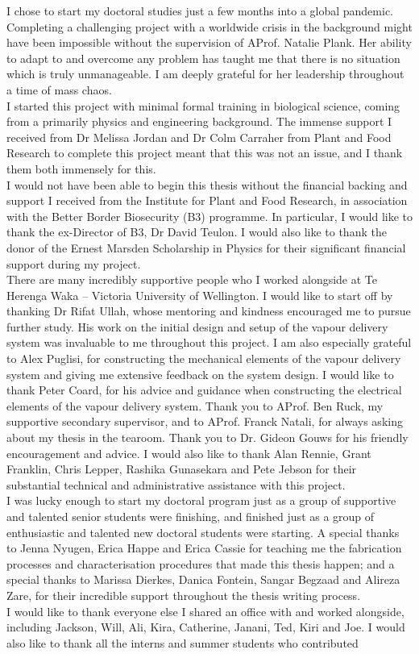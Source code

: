 \documentclass[
  a4paper,
]{scrbook}
\begin{document}
I chose to start my doctoral studies just a few months into a global pandemic. Completing a challenging project with a worldwide crisis in the background might have been impossible without the supervision of AProf. Natalie Plank. Her ability to adapt to and overcome any problem has taught me that there is no situation which is truly unmanageable. I am deeply grateful for her leadership throughout a time of mass chaos. \\[5pt] I started this project with minimal formal training in biological science, coming from a primarily physics and engineering background. The immense support I received from Dr Melissa Jordan and Dr Colm Carraher from Plant and Food Research to complete this project meant that this was not an issue, and I thank them both immensely for this. \\[5pt] I would not have been able to begin this thesis without the financial backing and support I received from the Institute for Plant and Food Research, in association with the Better Border Biosecurity (B3) programme. In particular, I would like to thank the ex-Director of B3, Dr David Teulon. I would also like to thank the donor of the Ernest Marsden Scholarship in Physics for their significant financial support during my project. \\[5pt] There are many incredibly supportive people who I worked alongside at Te Herenga Waka – Victoria University of Wellington. I would like to start off by thanking Dr Rifat Ullah, whose mentoring and kindness encouraged me to pursue further study. His work on the initial design and setup of the vapour delivery system was invaluable to me throughout this project. I am also especially grateful to Alex Puglisi, for constructing the mechanical elements of the vapour delivery system and giving me extensive feedback on the system design. I would like to thank Peter Coard, for his advice and guidance when constructing the electrical elements of the vapour delivery system. Thank you to AProf. Ben Ruck, my supportive secondary supervisor, and to AProf. Franck Natali, for always asking about my thesis in the tearoom. Thank you to Dr. Gideon Gouws for his friendly encouragement and advice. I would also like to thank Alan Rennie, Grant Franklin, Chris Lepper, Rashika Gunasekara and Pete Jebson for their substantial technical and administrative assistance with this project. \\[5pt] I was lucky enough to start my doctoral program just as a group of supportive and talented senior students were finishing, and finished just as a group of enthusiastic and talented new doctoral students were starting. A special thanks to Jenna Nyugen, Erica Happe and Erica Cassie for teaching me the fabrication processes and characterisation procedures that made this thesis happen; and a special thanks to Marissa Dierkes, Danica Fontein, Sangar Begzaad and Alireza Zare, for their incredible support throughout the thesis writing process. \\[5pt] I would like to thank everyone else I shared an office with and worked alongside, including Jackson, Will, Ali, Kira, Catherine, Janani, Ted, Kiri and Joe. I would also like to thank all the interns and summer students who contributed 
\end{document}
